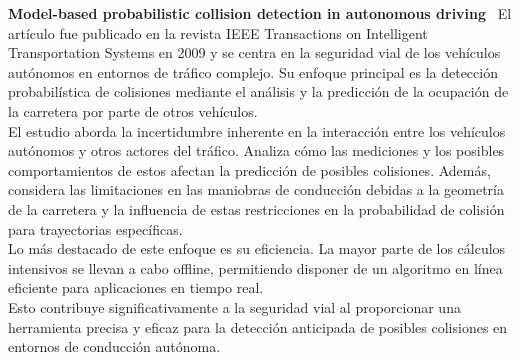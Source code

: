\noindent\textbf{Model-based probabilistic collision detection in autonomous driving}~\cite{althoff2009model}
El artículo fue publicado en la revista IEEE Transactions on Intelligent Transportation Systems en 2009 y se centra en la seguridad vial
de los vehículos autónomos en entornos de tráfico complejo.
Su enfoque principal es la detección probabilística de colisiones mediante el análisis y la predicción de la ocupación de la carretera
por parte de otros vehículos.\\
El estudio aborda la incertidumbre inherente en la interacción entre los vehículos autónomos y otros actores del tráfico.
Analiza cómo las mediciones y los posibles comportamientos de estos afectan la predicción de posibles colisiones.
Además, considera las limitaciones en las maniobras de conducción debidas a la geometría de la carretera y la influencia
de estas restricciones en la probabilidad de colisión para trayectorias específicas.\\
Lo más destacado de este enfoque es su eficiencia. La mayor parte de los cálculos intensivos se llevan a cabo offline,
permitiendo disponer de un algoritmo en línea eficiente para aplicaciones en tiempo real.                                                                           \\
Esto contribuye significativamente a la seguridad vial al proporcionar una herramienta precisa y eficaz para la detección anticipada de
posibles colisiones en entornos de conducción autónoma.                                                            \\
